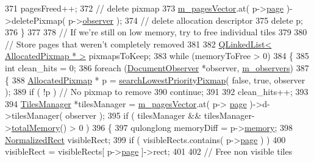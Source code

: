 \begin{DoxyCode}
371         pagesFreed++;
372         \textcolor{comment}{// delete pixmap}
373         \hyperlink{classOkular_1_1DocumentPrivate_a73b852d9a73ffe8061b66dbf9b290f17}{m\_pagesVector}.at( p->\hyperlink{structAllocatedPixmap_a197c0639216aa0819deb72fd8705d115}{page} )->deletePixmap( p->\hyperlink{structAllocatedPixmap_a5ee1fe9a6b1a37583c0ea54045cc7800}{observer} );
374         \textcolor{comment}{// delete allocation descriptor}
375         \textcolor{keyword}{delete} p;
376     \}
377 
378     \textcolor{comment}{// If we're still on low memory, try to free individual tiles}
379 
380     \textcolor{comment}{// Store pages that weren't completely removed}
381 
382     \hyperlink{classQLinkedList}{QLinkedList< AllocatedPixmap * >} pixmapsToKeep;
383     \textcolor{keywordflow}{while} (memoryToFree > 0)
384     \{
385         \textcolor{keywordtype}{int} clean\_hits = 0;
386         \textcolor{keywordflow}{foreach} (\hyperlink{classOkular_1_1DocumentObserver}{DocumentObserver} *observer, \hyperlink{classOkular_1_1DocumentPrivate_a604d83cdce56b4cab8d2bcccfc01fbfa}{m\_observers})
387         \{
388             \hyperlink{structAllocatedPixmap}{AllocatedPixmap} * p = \hyperlink{classOkular_1_1DocumentPrivate_a751cdd88fe8ba456a89f6c998a9ae35a}{searchLowestPriorityPixmap}( \textcolor{keyword}{
      false}, \textcolor{keyword}{true}, observer );
389             \textcolor{keywordflow}{if} ( !p ) \textcolor{comment}{// No pixmap to remove}
390                 \textcolor{keywordflow}{continue};
391 
392             clean\_hits++;
393 
394             \hyperlink{classOkular_1_1TilesManager}{TilesManager} *tilesManager = \hyperlink{classOkular_1_1DocumentPrivate_a73b852d9a73ffe8061b66dbf9b290f17}{m\_pagesVector}.at( p->
      \hyperlink{structAllocatedPixmap_a197c0639216aa0819deb72fd8705d115}{page} )->d->tilesManager( observer );
395             \textcolor{keywordflow}{if} ( tilesManager && tilesManager->\hyperlink{classOkular_1_1TilesManager_a7baf6b1ce882f1fea1499fa956097c23}{totalMemory}() > 0 )
396             \{
397                 qulonglong memoryDiff = p->\hyperlink{structAllocatedPixmap_a8fdfc9d87d0ce0852716295895606be0}{memory};
398                 \hyperlink{classOkular_1_1NormalizedRect}{NormalizedRect} visibleRect;
399                 \textcolor{keywordflow}{if} ( visibleRects.contains( p->\hyperlink{structAllocatedPixmap_a197c0639216aa0819deb72fd8705d115}{page} ) )
400                     visibleRect = visibleRects[ p->\hyperlink{structAllocatedPixmap_a197c0639216aa0819deb72fd8705d115}{page} ]->rect;
401 
402                 \textcolor{comment}{// Free non visible tiles}

\end{DoxyCode}

